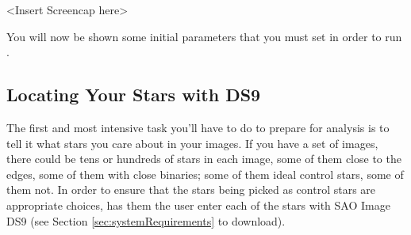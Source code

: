 \documentclass{article}
\begin{document}
<Insert Screencap here>

You will now be shown some initial parameters that you must set in order to run \oscaar.


\subsection{Locating Your Stars with DS9}

The first and most intensive task you'll have to do to prepare \oscaar  for analysis is to tell it what stars you care about in your images. If you have a set of images, there could be tens or hundreds of stars in each image, some of them close to the edges, some of them with close binaries; some of them ideal control stars, some of them not. In order to ensure that the stars being picked as control stars are appropriate choices, \oscaar has them the user enter each of the stars with SAO Image DS9 (see Section \ref{sec:systemRequirements} to download). 
\end{document}
